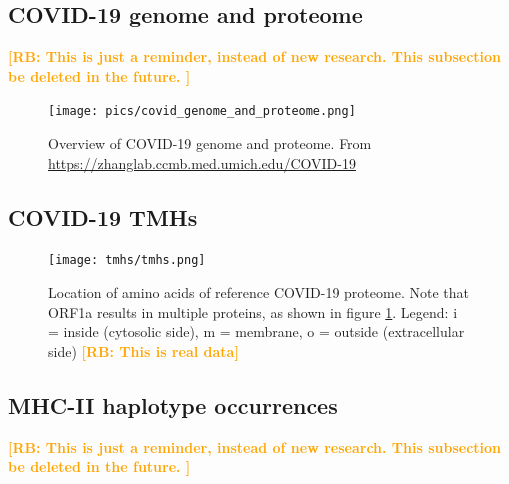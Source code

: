\documentclass{article}
\newcommand{\richel}[1]{\textcolor{orange}{\textbf{[RB: #1]}}}
\begin{document}
\subsection{COVID-19 genome and proteome}

\richel{
  This is just a reminder, instead of new research. 
  This subsection be deleted in the future.
}

\begin{figure}[!htbp]
  \texttt{[image: pics/covid\_genome\_and\_proteome.png]}
  \caption{
    Overview of COVID-19 genome and proteome.
    From 
    \url{https://zhanglab.ccmb.med.umich.edu/COVID-19}
  }
  \label{fig:covid_genome_and_proteome}
\end{figure}

\subsection{COVID-19 TMHs}

\begin{figure}[!htbp]
  \texttt{[image: tmhs/tmhs.png]}
  \caption{
    Location of amino acids of reference COVID-19 proteome.
    Note that ORF1a results in multiple proteins, 
    as shown in figure \ref{fig:covid_genome_and_proteome}.
    Legend: i = inside (cytosolic side), m = membrane, o = outside (extracellular side)
    \richel{This is real data}
  }
  \label{fig:covid_locatome}
\end{figure}


\subsection{MHC-II haplotype occurrences}

\richel{
  This is just a reminder, instead of new research. 
  This subsection be deleted in the future.
}

\begin{table}
  
  \caption{
    Percentage of MHC-II haplotypes, from \cite{greenbaum2011functional}
    \richel{
      This is just a reminder, instead of new research. 
      This table be deleted in the future.
    }
  }
  \label{table:mhc2_haplotypes}
\end{table}
\end{document}
